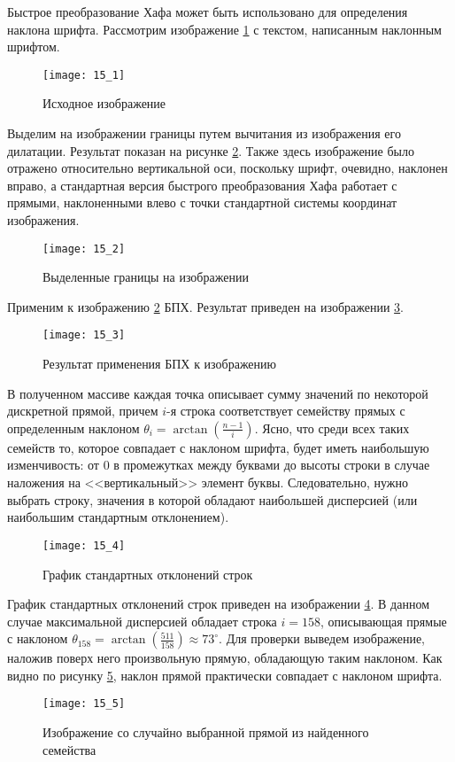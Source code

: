 
Быстрое преобразование Хафа может быть использовано для определения наклона шрифта. Рассмотрим изображение \ref{img:15_1} с текстом, написанным наклонным шрифтом.
\begin{figure}[!h]
    \centering
    \texttt{[image: 15\_1]}
    \caption{Исходное изображение}
    \label{img:15_1}
\end{figure}

Выделим на изображении границы путем вычитания из изображения его дилатации. Результат показан на рисунке \ref{img:15_2}. Также здесь изображение было отражено относительно вертикальной оси, поскольку шрифт, очевидно, наклонен вправо, а стандартная версия быстрого преобразования Хафа работает с прямыми, наклоненными влево с точки стандартной системы координат изображения.
\begin{figure}[!h]
    \centering
    \texttt{[image: 15\_2]}
    \caption{Выделенные границы на изображении}
    \label{img:15_2}
\end{figure}

Применим к изображению \ref{img:15_2} БПХ. Результат приведен на изображении \ref{img:15_3}.
\begin{figure}[!h]
    \centering
    \texttt{[image: 15\_3]}
    \caption{Результат применения БПХ к изображению}
    \label{img:15_3}
\end{figure}

В полученном массиве каждая точка описывает сумму значений по некоторой дискретной прямой, причем $i$-я строка соответствует семейству прямых с определенным наклоном $\theta_i = \arctan\left( \frac{n-1}{i} \right)$. Ясно, что среди всех таких семейств то, которое совпадает с наклоном шрифта, будет иметь наибольшую изменчивость: от 0 в промежутках между буквами до высоты строки в случае наложения на <<вертикальный>> элемент буквы. Следовательно, нужно выбрать строку, значения в которой обладают наибольшей дисперсией (или наибольшим стандартным отклонением).
\begin{figure}[!h]
    \centering
    \texttt{[image: 15\_4]}
    \caption{График стандартных отклонений строк}
    \label{img:15_4}
\end{figure}

График стандартных отклонений строк приведен на изображении \ref{img:15_4}. В данном случае максимальной дисперсией обладает строка $i=158$, описывающая прямые с наклоном $\theta_{158} = \arctan\left( \frac{511}{158} \right) \approx 73^{\circ}$. Для проверки выведем изображение, наложив поверх него произвольную прямую, обладающую таким наклоном. Как видно по рисунку \ref{img:15_5}, наклон прямой практически совпадает с наклоном шрифта.
\begin{figure}[!h]
    \centering
    \texttt{[image: 15\_5]}
    \caption{Изображение со случайно выбранной прямой из найденного семейства}
    \label{img:15_5}
\end{figure}
